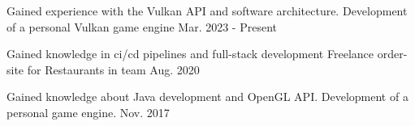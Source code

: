 

\begin{cventries}

  \cventry
    {Gained experience with the Vulkan API and software architecture.} %
    {Development of a personal Vulkan game engine} %
    {} %
    {Mar. 2023 - Present} %

  \cventry
    {Gained knowledge in ci/cd pipelines and full-stack development} %
    {Freelance order-site for Restaurants in team} %
    {} %
    {Aug. 2020} %

  \cventry
    {Gained knowledge about Java development and OpenGL API.} %
    {Development of a personal game engine.} %
    {} %
    {Nov. 2017} %

\end{cventries}

